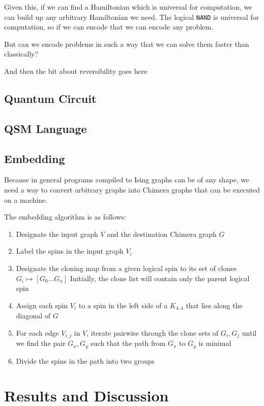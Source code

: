 \documentclass{article}
\begin{document}
Given this, if we can find a Hamiltonian which is universal for computation, we can build up any arbitrary Hamiltonian we need.  The logical
{\tt NAND} is universal for computation, so if we can encode that we can encode any problem.

But can we encode problems in such a way that we can solve them faster than classically?

And then the bit about reversibility goes here


\subsection{Quantum Circuit}


\subsection{QSM Language}

\subsection{Embedding}
Because in general programs compiled to Ising graphs can be of any shape, we need a way to convert arbitrary graphs into Chimera graphs that can be executed on a machine.

The embedding algorithm is as follows:

\begin{enumerate}
	\item Designate the input graph $V$ and the destination Chimera graph $G$
	\item Label the spins in the input graph $V_i$
	\item Designate the cloning map from a given logical spin to its set of clones $G_i \mapsto [G_0 \ldots G_n] $ Initially, the
		clone list will contain only the parent logical spin
	\item Assign each spin $V_i$ to a spin in the left side of a $K_{4,4}$ that lies along the diagonal of $G$
	\item For each edge $V_{i,j}$ in $V$, iterate pairwise through the clone sets of $G_i,G_j$ until we find the pair $G_x,G_y$ such that
		the path from $G_x$ to $G_y$ is minimal
	\item Divide the spins in the path into two groups
\end{enumerate}

\section{Results and Discussion}
\end{document}
